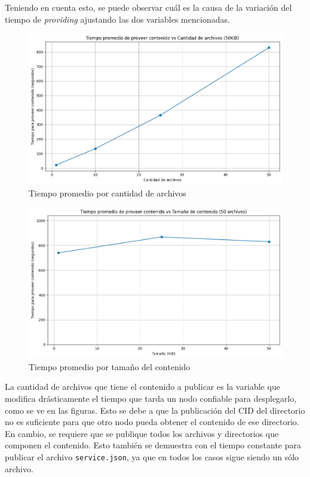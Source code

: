 Teniendo en cuenta esto, se puede observar cuál es la causa de la variación del tiempo de \textit{providing} ajustando las dos variables mencionadas.

\begin{figure}[H]
    \centering
    \includegraphics[width=1\linewidth]{img/metricas-ipfs/tiempo-por-cant-archivos.png}
    \caption{Tiempo promedio por cantidad de archivos}
    \label{fig:tiempo-por-cant-archivos.png}
\end{figure}

\begin{figure}[H]
    \centering
    \includegraphics[width=1\linewidth]{img/metricas-ipfs/tiempo-por-tamano.png}
    \caption{Tiempo promedio por tamaño del contenido}
    \label{fig:tiempo-por-tamano.png}
\end{figure}

La cantidad de archivos que tiene el contenido a publicar es la variable que modifica drásticamente el tiempo que tarda un nodo confiable para desplegarlo, como se ve en las figuras. Esto se debe a que la publicación del CID del directorio no es suficiente para que otro nodo pueda obtener el contenido de ese directorio. En cambio, se requiere que se publique todos los archivos y directorios que componen el contenido. Esto también se demuestra con el tiempo constante para publicar el archivo \texttt{service.json}, ya que en todos los casos sigue siendo un sólo archivo. 

